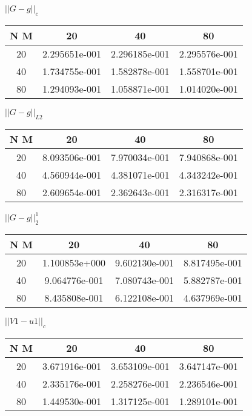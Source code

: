 \begin{center}
	$||G - g||_c$
	\begin{tabular}{|c|c|c|c|}
		\hline 
		N  M& 20& 40& 80\\ 
		\hline 
		20 & 2.295651e-001 & 2.296185e-001 & 2.295576e-001 \\ \hline 
		40 & 1.734755e-001 & 1.582878e-001 & 1.558701e-001 \\ \hline 
		80 & 1.294093e-001 & 1.058871e-001 & 1.014020e-001 \\ \hline 
		\hline 
	\end{tabular} 
\end{center} 
\begin{center}
	$||G - g||_{L2}$
	\begin{tabular}{|c|c|c|c|}
		\hline 
		N  M& 20& 40& 80\\ 
		\hline 
		20 & 8.093506e-001 & 7.970034e-001 & 7.940868e-001 \\ \hline 
		40 & 4.560944e-001 & 4.381071e-001 & 4.343242e-001 \\ \hline 
		80 & 2.609654e-001 & 2.362643e-001 & 2.316317e-001 \\ \hline 
		\hline 
	\end{tabular} 
\end{center} 
\begin{center}
	$||G - g||_{2}^1$
	\begin{tabular}{|c|c|c|c|}
		\hline 
		N  M& 20& 40& 80\\ 
		\hline 
		20 & 1.100853e+000 & 9.602130e-001 & 8.817495e-001 \\ \hline 
		40 & 9.064776e-001 & 7.080743e-001 & 5.882787e-001 \\ \hline 
		80 & 8.435808e-001 & 6.122108e-001 & 4.637969e-001 \\ \hline 
		\hline 
	\end{tabular} 
\end{center} 
\begin{center}
	$||V1 - u1||_c$
	\begin{tabular}{|c|c|c|c|}
		\hline 
		N  M& 20& 40& 80\\ 
		\hline 
		20 & 3.671916e-001 & 3.653109e-001 & 3.647147e-001 \\ \hline 
		40 & 2.335176e-001 & 2.258276e-001 & 2.236546e-001 \\ \hline 
		80 & 1.449530e-001 & 1.317125e-001 & 1.289101e-001 \\ \hline 
		\hline 
	\end{tabular} 
\end{center} 

